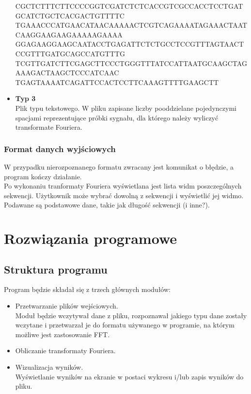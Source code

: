 \documentclass[a4size,final]{article}
\begin{document}
\begin{itemize}
{CGCTCTTTCTTCCCCGGTCGATCTCTCACCGTCGCCACCTCCTGATGCATCTGCTCACGACTGTTTTC\\
TGAAACCCATGAACATAACAAAAACTCGTCAGAAAATAGAAACTAATCAAGGAAGAAGAAAAAGAAAA\\
GGAGAAGGAAGCAATACCTGAGATTCTCTGCCTCCGTTTAGTAACTCCGTTTGATGCAGCCATGTTTG\\
TCGTTGATCTTCGAGCTTCCCTGGGTTTATCCATTAATGCAAGCTAGAAAGACTAAGCTCCCATCAAC\\
TGAGTAAAATCAGATTCCACTCCTTCAAAGTTTTGAAGCTT}
\item \textbf{Typ 3}\\
Plik typu tekstowego. W pliku zapisane liczby pooddzielane pojedynczymi spacjami reprezentujące próbki sygnału, dla którego należy wyliczyć transformate Fouriera.
\end{itemize}

\subsubsection{Format danych wyjściowych}
W przypadku nierozpoznanego formatu zwracany jest komunikat o błędzie, a program kończy działanie.\\
Po wykonaniu tranformaty Fouriera wyświetlana jest lista widm poszczególnych sekwencji. Użytkownik może wybrać dowolną z sekwencji i wyświetlić jej widmo. Podawane są podstawowe dane, takie jak długość sekwencji (i inne?).
\section{Rozwiązania programowe}
\subsection{Struktura programu}
Program będzie składał się z trzech głównych modułów:
\begin{itemize}
\item Przetwarzanie plików wejściowych.\\
Moduł będzie wczytywał dane z pliku, rozpoznawał jakiego typu dane zostały wczytane i przetwarzał je do formatu używanego w programie, na którym możliwe jest zastosowanie FFT.
\item Obliczanie transformaty Fouriera.\\
\item Wizualizacja wyników.\\
Wyświetlanie wyników na ekranie w postaci wykresu i/lub zapis wyników do pliku.
\end{itemize}
\end{document}
